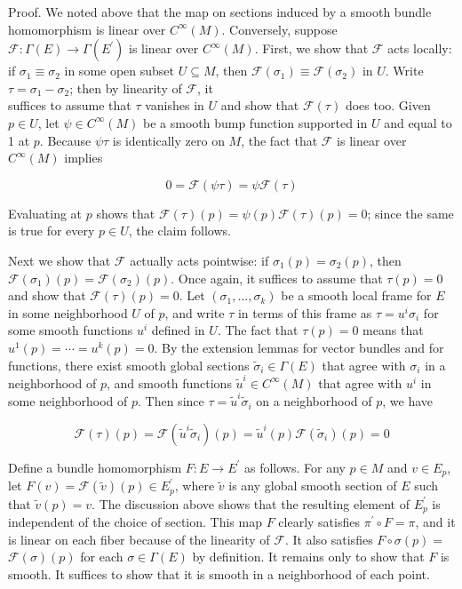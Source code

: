 \documentclass[10pt]{article}
\begin{document}
Proof. We noted above that the map on sections induced by a smooth bundle homomorphism is linear over $C^{\infty}(M)$. Conversely, suppose $\mathcal{F}: \Gamma(E) \rightarrow \Gamma\left(E^{\prime}\right)$ is linear over $C^{\infty}(M)$. First, we show that $\mathcal{F}$ acts locally: if $\sigma_{1} \equiv \sigma_{2}$ in some open subset $U \subseteq M$, then $\mathscr{F}\left(\sigma_{1}\right) \equiv \mathscr{F}\left(\sigma_{2}\right)$ in $U$. Write $\tau=\sigma_{1}-\sigma_{2}$; then by linearity of $\mathscr{F}$, it\\
suffices to assume that $\tau$ vanishes in $U$ and show that $\mathscr{F}(\tau)$ does too. Given $p \in U$, let $\psi \in C^{\infty}(M)$ be a smooth bump function supported in $U$ and equal to 1 at $p$. Because $\psi \tau$ is identically zero on $M$, the fact that $\mathscr{F}$ is linear over $C^{\infty}(M)$ implies

$$
0=\mathscr{F}(\psi \tau)=\psi \mathscr{F}(\tau)
$$

Evaluating at $p$ shows that $\mathscr{F}(\tau)(p)=\psi(p) \mathscr{F}(\tau)(p)=0$; since the same is true for every $p \in U$, the claim follows.

Next we show that $\mathcal{F}$ actually acts pointwise: if $\sigma_{1}(p)=\sigma_{2}(p)$, then $\mathcal{F}\left(\sigma_{1}\right)(p)=\mathcal{F}\left(\sigma_{2}\right)(p)$. Once again, it suffices to assume that $\tau(p)=0$ and show that $\mathcal{F}(\tau)(p)=0$. Let $\left(\sigma_{1}, \ldots, \sigma_{k}\right)$ be a smooth local frame for $E$ in some neighborhood $U$ of $p$, and write $\tau$ in terms of this frame as $\tau=u^{i} \sigma_{i}$ for some smooth functions $u^{i}$ defined in $U$. The fact that $\tau(p)=0$ means that $u^{1}(p)=\cdots=u^{k}(p)=0$. By the extension lemmas for vector bundles and for functions, there exist smooth global sections $\tilde{\sigma}_{i} \in \Gamma(E)$ that agree with $\sigma_{i}$ in a neighborhood of $p$, and smooth functions $\tilde{u}^{i} \in C^{\infty}(M)$ that agree with $u^{i}$ in some neighborhood of $p$. Then since $\tau=\tilde{u}^{i} \tilde{\sigma}_{i}$ on a neighborhood of $p$, we have

$$
\mathscr{F}(\tau)(p)=\mathscr{F}\left(\tilde{u}^{i} \tilde{\sigma}_{i}\right)(p)=\tilde{u}^{i}(p) \mathscr{F}\left(\tilde{\sigma}_{i}\right)(p)=0
$$

Define a bundle homomorphism $F: E \rightarrow E^{\prime}$ as follows. For any $p \in M$ and $v \in E_{p}$, let $F(v)=\mathcal{F}(\tilde{v})(p) \in E_{p}^{\prime}$, where $\widetilde{v}$ is any global smooth section of $E$ such that $\tilde{v}(p)=v$. The discussion above shows that the resulting element of $E_{p}^{\prime}$ is independent of the choice of section. This map $F$ clearly satisfies $\pi^{\prime} \circ F=\pi$, and it is linear on each fiber because of the linearity of $\mathcal{F}$. It also satisfies $F \circ \sigma(p)=$ $\mathcal{F}(\sigma)(p)$ for each $\sigma \in \Gamma(E)$ by definition. It remains only to show that $F$ is smooth. It suffices to show that it is smooth in a neighborhood of each point.
\end{document}

